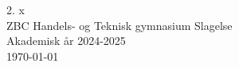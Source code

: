 \begin{titlepage}
    \vspace{1cm}


    \vfill

    2. x \\
    ZBC Handels- og Teknisk gymnasium Slagelse \\
    Akademisk år 2024-2025 \\
    \today
\end{titlepage}
